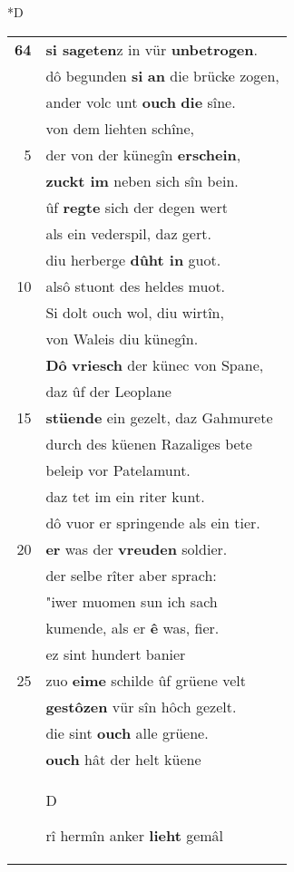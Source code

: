 \documentclass[8pt,a4paper,notitlepage]{article}
\begin{document}
\begin{table}[ht]
\begin{minipage}[t]{0.5\linewidth}
\small
\begin{center}*D
\end{center}
\begin{tabular}{rl}
\textbf{64} & \textbf{si sageten}z in vür \textbf{unbetrogen}.\\ 
 & dô begunden \textbf{si} \textbf{an} die brücke zogen,\\ 
 & ander volc unt \textbf{ouch} \textbf{die} sîne.\\ 
 & von dem liehten schîne,\\ 
5 & der von der künegîn \textbf{erschein},\\ 
 & \textbf{zuckt im} neben sich sîn bein.\\ 
 & ûf \textbf{regte} sich der degen wert\\ 
 & als ein vederspil, daz gert.\\ 
 & diu herberge \textbf{dûht in} guot.\\ 
10 & alsô stuont des heldes muot.\\ 
 & Si dolt ouch wol, diu wirtîn,\\ 
 & von Waleis diu künegîn.\\ 
 & \textbf{Dô} \textbf{vriesch} der künec von Spane,\\ 
 & daz ûf der Leoplane\\ 
15 & \textbf{stüende} ein gezelt, daz Gahmurete\\ 
 & durch des küenen Razaliges bete\\ 
 & beleip vor Patelamunt.\\ 
 & daz tet im ein riter kunt.\\ 
 & dô vuor er springende als ein tier.\\ 
20 & \textbf{er} was der \textbf{vreuden} soldier.\\ 
 & der selbe rîter aber sprach:\\ 
 & "iwer muomen sun ich sach\\ 
 & kumende, als er \textbf{ê} was, fier.\\ 
 & ez sint hundert banier\\ 
25 & zuo \textbf{eime} schilde ûf grüene velt\\ 
 & \textbf{gestôzen} vür sîn hôch gezelt.\\ 
 & die sint \textbf{ouch} alle grüene.\\ 
 & \textbf{ouch} hât der helt küene\\ 
 & \begin{large}D\end{large}rî hermîn anker \textbf{lieht} gemâl\\ 

\end{tabular}
\end{minipage}
\end{table}
\end{document}
